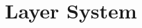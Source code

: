 \documentclass[../../../../main.tex]{subfiles}
\begin{document}
\section{Layer System}

\newpage
\end{document}

